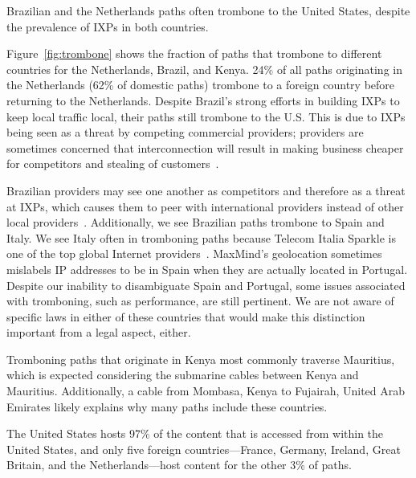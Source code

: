 \begin{finding}
Brazilian and the Netherlands paths often trombone to the United States, despite the prevalence of IXPs in both countries.
\end{finding}
\noindent
Figure~\ref{fig:trombone}
shows the fraction of paths that trombone to
different countries for the Netherlands, Brazil, and Kenya. 24\% of
all paths originating in the Netherlands (62\% of domestic paths)
trombone to a foreign country before returning to the
Netherlands. Despite Brazil's strong efforts in building IXPs to keep
local traffic local, 
their paths still trombone to the U.S.  This is due to IXPs being seen
as a threat by competing commercial providers; providers are sometimes
concerned that interconnection will result in making business
cheaper for competitors and stealing of customers~\cite{ixp_policy}.

Brazilian providers may see one another as competitors and therefore as a
threat at IXPs, which causes them to peer with international providers instead
of other local providers~\cite{ixp_policy}.  Additionally, we see Brazilian paths trombone to
Spain and Italy.  We see Italy often in tromboning paths because Telecom
Italia Sparkle is one of the top global Internet providers~\cite{bakers}. 
MaxMind's geolocation sometimes mislabels IP addresses to be in
Spain when they are actually located in Portugal.  Despite our inability to
disambiguate Spain and Portugal, some issues associated with tromboning,
such as performance, are still pertinent. We are not aware of specific laws in
either of these countries that would make this distinction important from a legal aspect, either.

Tromboning paths that originate in Kenya most commonly traverse Mauritius,
which is expected considering the submarine cables between Kenya and
Mauritius.  Additionally, a cable from Mombasa,
Kenya to Fujairah, United Arab Emirates likely explains why many
paths include these countries. 


\begin{finding}
The United States hosts 97\% of the content that is accessed from within the United States, and only five foreign countries---France, Germany, Ireland, Great Britain, and the Netherlands---host content for the other 3\% of paths.
\end{finding}
\noindent

